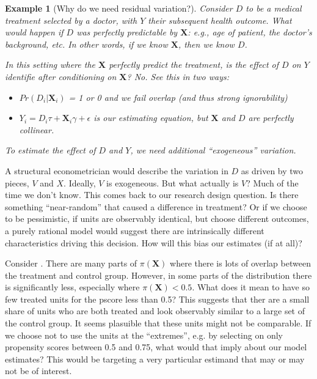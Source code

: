 \documentclass{tufte-handout}
\theoremstyle{break}
\newtheorem{exmp}{Example}
\newcommand{\bX}{\mathbf{X}}
\begin{document}
\begin{boxD}
  \begin{exmp}[Why do we need residual variation?]
    Consider $D$ to be a medical treatment selected by a doctor,  with $Y$ their subsequent health outcome. What would happen if $D$ was perfectly predictable by $\mathbf{X}$: e.g., age of patient, the doctor's background, etc. In other words, if we know $\mathbf{X}$, then we know $D$.
    
    In this setting where the $\bX$ perfectly predict the treatment, is the effect of $D$ on $Y$ identifie after conditioning on  $\mathbf{X}$? No. See this in two ways:
      \begin{itemize}
      \item $Pr(D_{i} | \mathbf{X}_{i})$ = 1 or 0  and we fail overlap (and thus strong ignorability)
      \item $Y_{i} = D_{i}\tau + \mathbf{X}_{i}\gamma + \epsilon$ is our estimating equation, but $\bX$ and $D$ are perfectly collinear.
      \end{itemize}
    To estimate the effect of $D$ and $Y$, we need additional ``exogeneous'' variation.
    \end{exmp}
  \end{boxD}    
      
 A structural econometrician would describe the variation in $D$ as driven by two pieces, $V$ and $X$. Ideally, $V$ is exogeneous.  But what actually is $V$? Much of the time we don't know. This comes back to our research design question. Is there something ``near-random'' that caused a difference in treatment?  Or if we choose to be pessimistic, if units are observably identical, but choose different outcomes, a purely rational model would suggest there are intrinsically different characteristics driving this  decision. How will this bias our estimates (if at all)?      

Consider . There are many parts of $\pi(\mathbf{X})$ where there is lots of overlap between the treatment and control group. However, in some parts of the distribution there is significantly less, especially where $\pi(\bX) < 0.5$. What does it mean to have so few treated units for the pscore less than 0.5? This suggests that ther are a small share of units who are both treated and look observably similar to a large set of the control group. It seems plasuible that these units might not be comparable. If we choose not to use the units at the ``extremes'', e.g. by selecting on only propensity scores between 0.5 and 0.75, what would that imply about our model estimates? This would be targeting a very particular estimand that may or may not be of interest.
\end{document}
